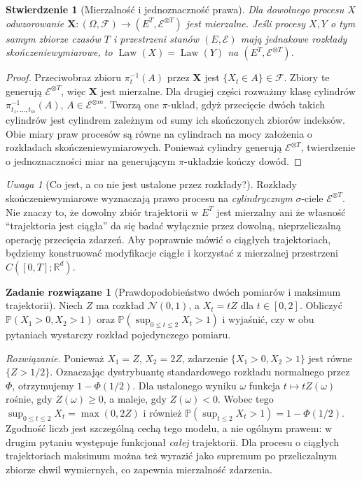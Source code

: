 \documentclass[11pt,a4paper,oneside]{report}
\numberwithin{equation}{chapter}
\theoremstyle{plain}
\newtheorem{stwierdzenie}[twierdzenie]{Stwierdzenie}
\theoremstyle{definition}
\newtheorem{zadanie}{Zadanie rozwiązane}[chapter]
\theoremstyle{remark}
\newtheorem{uwaga}{Uwaga}[chapter]
\newcommand{\R}{\mathbb{R}}
\newcommand{\Prob}{\mathbb{P}}
\newcommand{\Law}{\operatorname{Law}}
\newcommand{\calF}{\mathcal{F}}
\newcommand{\calE}{\mathcal{E}}
\newcommand{\Normal}{\mathcal{N}}
\begin{document}
\begin{stwierdzenie}[Mierzalność i jednoznaczność prawa]
Dla dowolnego procesu $X$ odwzorowanie
$\mathbf X:(\Omega,\calF)\to(E^T,\calE^{\otimes T})$ jest
mierzalne. Jeśli procesy $X,Y$ o tym samym zbiorze czasów $T$
i przestrzeni stanów $(E,\calE)$ mają jednakowe rozkłady
skończeniewymiarowe, to $\Law(X)=\Law(Y)$ na
$(E^T,\calE^{\otimes T})$.
\end{stwierdzenie}
\begin{proof}
Przeciwobraz zbioru $\pi_t^{-1}(A)$ przez $\mathbf X$ jest
$\{X_t\in A\}\in\calF$. Zbiory te generują $\calE^{\otimes T}$,
więc $\mathbf X$ jest mierzalne. Dla drugiej części rozważmy
klasę cylindrów $\pi_{t_1,\ldots,t_m}^{-1}(A)$,
$A\in\calE^{\otimes m}$. Tworzą one $\pi$-układ, gdyż przecięcie
dwóch takich cylindrów jest cylindrem zależnym od sumy ich
skończonych zbiorów indeksów. Obie miary praw procesów
są równe na cylindrach na mocy założenia o rozkładach
skończeniewymiarowych. Ponieważ cylindry generują
$\calE^{\otimes T}$, twierdzenie o jednoznaczności miar
na generującym $\pi$-układzie kończy dowód.
\end{proof}

\begin{uwaga}[Co jest, a co nie jest ustalone przez rozkłady?]
Rozkłady skończeniewymiarowe wyznaczają prawo procesu na
\emph{cylindrycznym} $\sigma$-ciele $\calE^{\otimes T}$.
Nie znaczy to, że dowolny zbiór trajektorii w $E^T$ jest mierzalny
ani że własność ``trajektoria jest ciągła'' da się badać
wyłącznie przez dowolną, nieprzeliczalną operację przecięcia
zdarzeń. Aby poprawnie mówić o ciągłych trajektoriach, będziemy
konstruować modyfikacje ciągłe i korzystać z mierzalnej przestrzeni
$C([0,T];\R^d)$.
\end{uwaga}


\begin{zadanie}[Prawdopodobieństwo dwóch pomiarów i maksimum trajektorii]
Niech $Z$ ma rozkład $\Normal(0,1)$, a $X_t=tZ$ dla
$t\in[0,2]$. Obliczyć $\Prob(X_1>0,X_2>1)$ oraz
$\Prob(\sup_{0\le t\le2}X_t>1)$ i wyjaśnić, czy w obu pytaniach
wystarczy rozkład pojedynczego pomiaru.

\emph{Rozwiązanie.} Ponieważ $X_1=Z$, $X_2=2Z$,
zdarzenie $\{X_1>0,X_2>1\}$ jest równe $\{Z>1/2\}$.
Oznaczając dystrybuantę standardowego rozkładu normalnego przez
$\Phi$, otrzymujemy $1-\Phi(1/2)$.
Dla ustalonego wyniku $\omega$ funkcja $t\mapsto tZ(\omega)$
rośnie, gdy $Z(\omega)\ge0$, a maleje, gdy $Z(\omega)<0$.
Wobec tego $\sup_{0\le t\le2}X_t=\max(0,2Z)$ i również
$\Prob(\sup_{t\le2}X_t>1)=1-\Phi(1/2)$.
Zgodność liczb jest szczególną cechą tego modelu, a nie ogólnym
prawem: w drugim pytaniu występuje funkcjonał \emph{całej}
trajektorii. Dla procesu o ciągłych trajektoriach maksimum można
też wyrazić jako supremum po przeliczalnym zbiorze chwil
wymiernych, co zapewnia mierzalność zdarzenia.
\end{zadanie}
\end{document}
